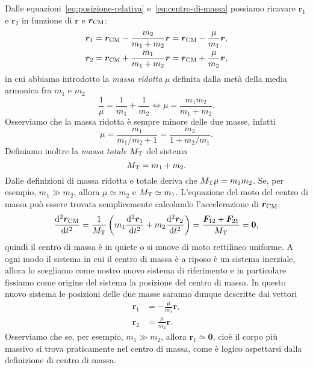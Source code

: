 Dalle equazioni~\eqref{eq:posizione-relativa} e~\eqref{eq:centro-di-massa}
possiamo ricavare $\bm{r}_1$ e $\bm{r}_2$ in funzione di $\bm{r}$ e
$\bm{r}_\textup{CM}$:
\begin{subequations}
  \label{eq:r1-r2-posizione-relativa-cdm}
  \begin{align}
    \bm{r}_1 &= \bm{r}_\textup{CM} - \frac{m_2}{m_1+m_2}\bm{r} =
    \bm{r}_\textup{CM} - \frac{\mu}{m_1}\bm{r},\\
    \bm{r}_2 &= \bm{r}_\textup{CM} + \frac{m_1}{m_1+m_2}\bm{r} =
    \bm{r}_\textup{CM} + \frac{\mu}{m_2}\bm{r},
  \end{align}
\end{subequations}
in cui abbiamo introdotto la \emph{massa ridotta} $\mu$ definita dalla metà
della media armonica fra $m_1$ e $m_2$
\begin{equation}
  \frac{1}{\mu} = \frac{1}{m_1} + \frac{1}{m_2} \iff \mu=\frac{m_1m_2}{m_1+m_2}.
\end{equation}
Osserviamo che la massa ridotta è sempre minore delle due masse, infatti
\begin{equation}
  \mu =\frac{m_1}{m_1/m_2+1} = \frac{m_2}{1+m_2/m_1}.
\end{equation}
Definiamo inoltre la \emph{massa totale} $M_\textup{T}$ del sistema
\begin{equation}
  M_\textup{T}=m_1+m_2.
\end{equation}
Dalle definizioni di massa ridotta e totale deriva che
$M_\textup{T}\mu=m_1m_2$. Se, per esempio, $m_1\gg m_2$, allora $\mu\simeq m_2$ e
$M_\textup{T}\simeq m_1$. L'equazione del moto del centro di massa può essere
trovata semplicemente calcolando l'accelerazione di $\bm{r}_\textup{CM}$:
\begin{equation}
  \toder[2]{\bm{r}_\textup{CM}}{t} = \frac{1}{M_\textup{T}}
  \left(
    m_1\toder[2]{\bm{r}_1}{t} + m_2\toder[2]{\bm{r}_2}{t}
  \right) = \frac{\bm{F}_{12}+\bm{F}_{21}}{M_\textup{T}} = \bm{0},
\end{equation}
quindi il centro di massa è in quiete o si muove di moto rettilineo uniforme. A
ogni modo il sistema in cui il centro di massa è a riposo è un sistema
inerziale, allora lo scegliamo come nostro nuovo sistema di riferimento e in
particolare fissiamo come origine del sistema la posizione del centro di
massa. In questo nuovo sistema le posizioni delle due masse saranno dunque
descritte dai vettori
\begin{subequations}
  \label{eq:r1-r2-nel-cdm}
  \begin{align}
    \bm{r}_1 &= -\frac{\mu}{m_1}\bm{r},\\
    \bm{r}_2 &= \frac{\mu}{m_2}\bm{r}.
  \end{align}
\end{subequations}
Osserviamo che se, per esempio, $m_1\gg m_2$, allora $\bm{r}_1\simeq\bm{0}$,
cioè il corpo più massivo si trova praticamente nel centro di massa, come è
logico aspettarsi dalla definizione di centro di massa.

